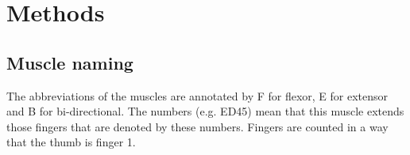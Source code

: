 \appendix


\section{Methods} %

\subsection{Muscle naming} %
\label{ap:sub:muscle_naming}

The abbreviations of the muscles are annotated by F for flexor, E for extensor and B for bi-directional. The numbers (e.g. ED45) mean that this muscle extends those fingers that are denoted by these numbers. Fingers are counted in a way that the thumb is finger 1.

